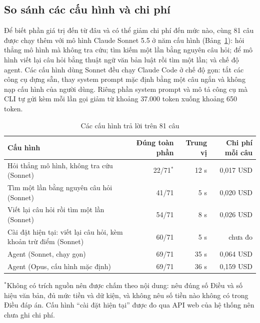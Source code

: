 \subsection{So sánh các cấu hình và chi phí}
\label{sec:ch5-cau-hinh}

Để biết phần giá trị đến từ đâu và có thể giảm chi phí đến mức nào, cùng 81 câu được chạy thêm với mô hình Claude Sonnet 5.5 ở năm cấu hình (Bảng~\ref{tab:ch5-cau-hinh}): hỏi thẳng mô hình mà không tra cứu; tìm kiếm một lần bằng nguyên câu hỏi; để mô hình viết lại câu hỏi bằng thuật ngữ văn bản luật rồi tìm một lần; và chế độ agent. Các cấu hình dùng Sonnet đều chạy Claude Code ở chế độ gọn: tắt các công cụ dựng sẵn, thay system prompt mặc định bằng một câu ngắn và không nạp cấu hình của người dùng. Riêng phần system prompt và mô tả công cụ mà CLI tự gửi kèm mỗi lần gọi giảm từ khoảng 37.000 token xuống khoảng 650 token.

\begin{table}[H]
\centering
\caption{Các cấu hình trả lời trên 81 câu}
\label{tab:ch5-cau-hinh}
\footnotesize
\begin{tabularx}{\textwidth}{@{}>{\raggedright\arraybackslash}X r r r@{}}
\toprule
\textbf{Cấu hình} & \textbf{Đúng toàn phần} & \textbf{Trung vị} & \textbf{Chi phí mỗi câu} \\
\midrule
Hỏi thẳng mô hình, không tra cứu (Sonnet) & 22/71$^{*}$ & 12 s & 0,017 USD \\
Tìm một lần bằng nguyên câu hỏi (Sonnet) & 41/71 & 5 s & 0,020 USD \\
Viết lại câu hỏi rồi tìm một lần (Sonnet) & 54/71 & 8 s & 0,026 USD \\
Cài đặt hiện tại: viết lại câu hỏi, kèm khoản trừ điểm (Sonnet) & 60/71 & 5 s & chưa đo \\
Agent (Sonnet, chạy gọn) & 69/71 & 35 s & 0,064 USD \\
Agent (Opus, cấu hình mặc định) & 69/71 & 36 s & 0,159 USD \\
\bottomrule
\end{tabularx}

\smallskip
\raggedright\footnotesize $^{*}$Không có trích nguồn nên được chấm theo nội dung: nêu đúng số Điều và số hiệu văn bản, đủ mức tiền và dữ kiện, và không nêu số tiền nào không có trong Điều đáp án. Cấu hình ``cài đặt hiện tại'' được đo qua API web của hệ thống nên chưa ghi chi phí.
\end{table}

